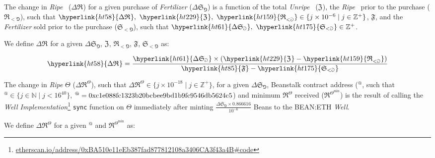 \documentclass[tikz]{article}
\newcommand{\code}[1]{\texttt{#1}}
\newcommand{\term}[1]{\textsl{#1}}
\newcommand{\fref}[1]{\footnote{\href{http://#1}{#1}}}
\newcommand{\Bean}{} %
\newcommand{\Beanstalk}{} %
\newcommand{\bean}{} %
\begin{document}
The change in \term{Ripe} \Bean\ (\hyperlink{ht58}{$\Delta \mathfrak{R}^{\bean}$}) for a given purchase of \term{Fertilizer} (\hyperlink{ht61}{$\Delta \mathfrak{S}_{\Game}$}) is a function of the total \term{Unripe} \Bean\ (\hyperlink{ht229}{$\mathfrak{Z}^{\bean}$}), the \term{Ripe} \Bean\ prior to the purchase (\hyperlink{ht159}{$\mathfrak{R}_{<\Game}^{\bean}$}),  such that $\hyperlink{ht58}{\Delta \mathfrak{R}^{\bean}},\ \hyperlink{ht229}{\mathfrak{Z}^{\bean}},\ \hyperlink{ht159}{\mathfrak{R}_{<\Game}^{\bean}} \in \{j \times 10^{-6} \mid j \in \mathbb{Z}^{+} \}$, \hyperlink{ht85}{$\mathfrak{F}$}, and the \term{Fertilizer} sold prior to the purchase (\hyperlink{ht175}{$\mathfrak{S}_{<\Game}$}),  such that $\hyperlink{ht61}{\Delta \mathfrak{S}_{\Game}},\ \hyperlink{ht175}{\mathfrak{S}_{<\Game}} \in \mathbb{Z}^{+}$.

We define \hyperlink{ht58}{$\Delta \mathfrak{R}^{\bean}$} for a given \hyperlink{ht61}{$\Delta \mathfrak{S}_{\Game}$}, \hyperlink{ht229}{$\mathfrak{Z}^{\bean}$}, \hyperlink{ht159}{$\mathfrak{R}_{<\Game}^{\bean}$}, \hyperlink{ht85}{$\mathfrak{F}$}, \hyperlink{ht175}{$\mathfrak{S}_{<\Game}$} as:

    $$
        \hyperlink{ht58}{\Delta \mathfrak{R}^{\bean}} = 
            \frac{\hyperlink{ht61}{\Delta \mathfrak{S}_{\Game}} \times 
                    (\hyperlink{ht229}{\mathfrak{Z}^{\bean}} - \hyperlink{ht159}{\mathfrak{R}_{<\Game}^{\bean}})}
                {\hyperlink{ht85}{\mathfrak{F}} - \hyperlink{ht175}{\mathfrak{S}_{<\Game}}}
    $$

\newpage

The change in \term{Ripe} $\Theta$ ($\Delta \mathfrak{R}^{\Theta}$), such that $\Delta \mathfrak{R}^{\Theta} \in \{j \times 10^{-18} \mid j \in \mathbb{Z}^{+} \}$, for a given \hyperlink{ht61}{$\Delta \mathfrak{S}_{\Game}$}, Beanstalk contract address ($\Beanstalk^{@}$, such that $\Beanstalk^{@} \in \{j \in \mathbb{N} \mid j < 16^{40} \}$, $\Beanstalk^{@} = \\ \text{0xc1e088fc1323b20bcbee9bd1b9fc9546db5624c5}$) and minimum $\mathfrak{R}^{\Theta}$ received ($\mathfrak{R}^{{\Theta}^{\text{min}}}$) is the result of calling the \term{Well Implementation}\fref{etherscan.io/address/0xBA510e11eEb387fad877812108a3406CA3f43a4B\#code} \code{sync} function on $\Theta$ immediately after minting $\frac{\Delta \mathfrak{S}_{\Game} \times 0.866616}{10^{-6}}$ Beans to the BEAN:ETH \term{Well}.

We define $\Delta \mathfrak{R}^{\Theta}$ for a given $\Beanstalk^{@}$ and $\mathfrak{R}^{{\Theta}^{\text{min}}}$ as:
\end{document}
